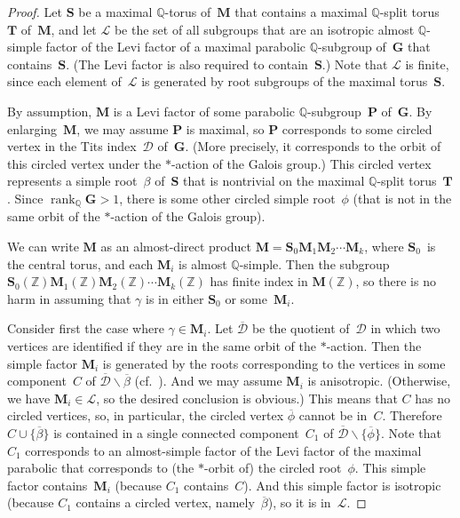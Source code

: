 \documentclass[pdftex]{sigma}
\newcommand{\QQ}{\mathbb{Q}}
\newcommand{\ZZ}{\mathbb{Z}}
\newcommand{\Ga}{\mathbf{G}}
\newcommand{\Ma}{\mathbf{M}}
\newcommand{\Pa}{\mathbf{P}}
\newcommand{\Sa}{\mathbf{S}}
\newcommand{\Ta}{\mathbf{T}}
\DeclareMathOperator{\rank}{rank}
\newcommand{\quot}{\overline}
\newcommand{\subgroups}{\mathcal{L}}
\numberwithin{equation}{section}
\theoremstyle{definition}
\begin{document}
\begin{proof}
Let $\Sa$ be a maximal $\QQ$-torus of~$\Ma$ that contains a maximal $\QQ$-split torus~$\Ta$ of~$\Ma$, and let $\subgroups$ be the set of all subgroups that are an isotropic almost $\QQ$-simple factor of the Levi factor of a maximal parabolic $\QQ$-subgroup of~$\Ga$ that contains~$\Sa$. (The Levi factor is also required to contain~$\Sa$.) Note that $\subgroups$ is finite, since each element of~$\subgroups$ is generated by root subgroups of the maximal torus~$\Sa$.

By assumption, $\Ma$ is a Levi factor of some parabolic $\QQ$-subgroup~$\Pa$ of~$\Ga$. By enlarging~$\Ma$, we may assume $\Pa$ is maximal, so $\Pa$ corresponds to some circled vertex in the Tits index~$\mathcal{D}$ of~$\Ga$. (More precisely, it corresponds to the orbit of this circled vertex under the $*$-action of the Galois group.)
This circled vertex represents a simple root~$\beta$ of~$\Sa$ that is nontrivial on the maximal $\QQ$-split torus~$\Ta$. Since $\rank_\QQ \Ga > 1$, there is some other circled simple root~$\phi$ (that is not in the same orbit of the $*$-action of the Galois group).

We can write $\Ma$ as an almost-direct product $\Ma = \Sa_0 \Ma_1 \Ma_2 \cdots \Ma_k$, where $\Sa_0$~is the central torus, and each $\Ma_i$ is almost $\QQ$-simple.
Then the subgroup $\Sa_0(\ZZ) \Ma_1(\ZZ) \Ma_2(\ZZ) \cdots \Ma_k(\ZZ)$ has finite index in $\Ma(\ZZ)$, so there is no harm in assuming that $\gamma$ is in either $\Sa_0$ or some~$\Ma_i$.

Consider first the case where $\gamma \in \Ma_i$.
Let $\quot{\mathcal{D}}$ be the quotient of~$\mathcal{D}$ in which two vertices are identified if they are in the same orbit of the $*$-action. Then the simple factor $\Ma_i$ is generated by the roots corresponding to the vertices in some component~$C$ of $\quot{\mathcal{D}} \smallsetminus \quot{\beta}$ (cf.\ \cite[????~2.5.4, p.~41]{Tits-Classif}).
And we may assume $\Ma_i$ is anisotropic. (Otherwise, we have $\Ma_i \in \subgroups$, so the desired conclusion is obvious.) This means that $C$ has no circled vertices, so, in particular, the circled vertex $\quot{\phi}$ cannot be in~$C$. Therefore $C \cup \{\quot{\beta}\}$ is contained in a single connected component~$C_1$ of $\quot{\mathcal{D}} \smallsetminus \{\quot{\phi}\}$. Note that $C_1$ corresponds to an almost-simple factor of the Levi factor of the maximal parabolic that corresponds to (the $*$-orbit of) the circled root~$\phi$. This simple factor contains~$\Ma_i$ (because $C_1$ contains~$C$). And this simple factor is isotropic (because $C_1$ contains a circled vertex, namely~$\quot{\beta}$), so it is in~$\subgroups$.


\end{proof}
\end{document}
